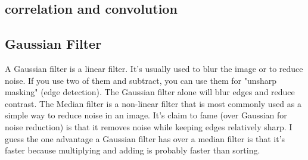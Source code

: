 \documentclass[a4paper]{article}
\begin{document}
\subsection{correlation and convolution}
\label{sec:org5a6f019}
\subsection{Gaussian Filter}
\label{sec:orge41f316}
    A Gaussian filter is a linear filter. It's usually used to blur the image or to reduce noise. If you use two of them and subtract,
    you can use them for "unsharp masking" (edge detection).
    The Gaussian filter alone will blur edges and reduce contrast.
The Median filter is a non-linear filter that is most commonly used as a simple way to reduce noise in an image.
It's claim to fame (over Gaussian for noise reduction)
is that it removes noise while keeping edges relatively sharp.
I guess the one advantage a Gaussian filter has over a median filter is that it's faster because multiplying and adding is probably faster than sorting.
\end{document}
